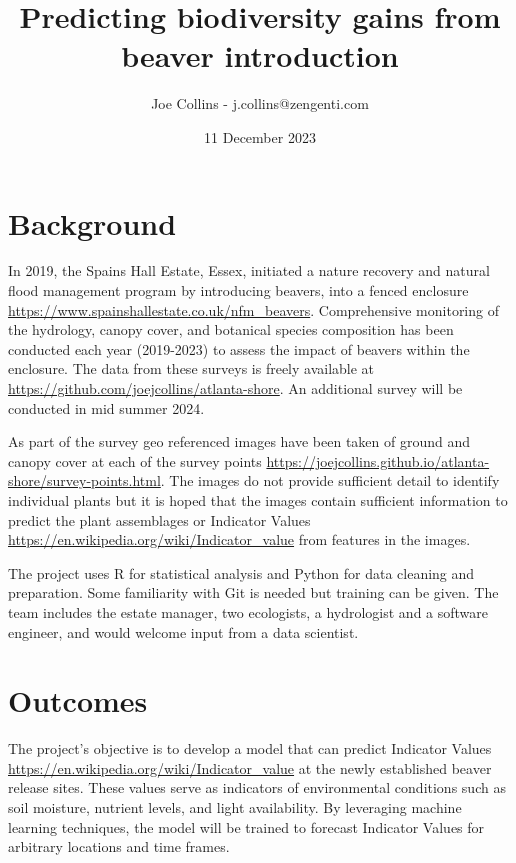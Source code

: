 \documentclass{roles}
\title{Predicting biodiversity gains from beaver introduction}
\author{Joe Collins - j.collins@zengenti.com}
\date{11 December 2023}
\begin{document}
\maketitle

\section*{Background}

In 2019, the Spains Hall Estate, Essex,
initiated a nature recovery and natural flood management program by introducing beavers,
into a fenced enclosure
\href{https://www.spainshallestate.co.uk/nfm\_beavers}{https://www.spainshallestate.co.uk/nfm\_beavers}.
Comprehensive monitoring of
the hydrology, canopy cover, and botanical species composition
has been conducted each year (2019-2023)
to assess the impact of beavers within the enclosure.
The data from these surveys is freely available at
\href{https://github.com/joejcollins/atlanta-shore}{https://github.com/joejcollins/atlanta-shore}.
An additional survey will be conducted in mid summer 2024.

As part of the survey geo referenced images have been taken
of ground and canopy cover at each of the survey points
\href{https://joejcollins.github.io/atlanta-shore/survey-points.html}{https://joejcollins.github.io/atlanta-shore/survey-points.html}.
The images do not provide sufficient detail to identify individual plants
but it is hoped that the images contain sufficient information to predict
the plant assemblages or Indicator Values
\href{https://en.wikipedia.org/wiki/Indicator\_value}{https://en.wikipedia.org/wiki/Indicator\_value}
from features in the images.

The project uses R for statistical analysis and Python for data cleaning and preparation.
Some familiarity with Git is needed but training can be given.
The team includes the estate manager, two ecologists, a hydrologist and a software engineer,
and would welcome input from a data scientist.
\section*{Outcomes}

The project's objective is to develop a model
that can predict Indicator Values
\href{https://en.wikipedia.org/wiki/Indicator\_value}{https://en.wikipedia.org/wiki/Indicator\_value}
at the newly established beaver release sites.
These values serve as indicators of environmental conditions such as
soil moisture, nutrient levels, and light availability.
By leveraging machine learning techniques,
the model will be trained to forecast Indicator Values for arbitrary locations and time frames.
\end{document}
